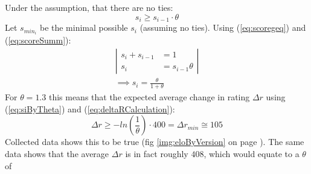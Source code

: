 \documentclass[12pt]{article}
\newcommand{\imgRef}[1]{(fig \ref{#1} on page \pageref{#1})}
\newcommand{\quckeq}[1]{(\ref{#1})}
\newcommand{\quickeq}[1]{\quckeq{#1}}
\newcommand{\FittedEloRaiting}{408}
\begin{document}
Under the assumption, that there are no ties:
\begin{equation}\label{eq:scoregeq}
s_i \geqslant s_{i-1} \cdot \theta
\end{equation}
Let \(s_{min_i}\) be the minimal possible \(s_i\) (assuming no ties). Using \quickeq{eq:scoregeq} and \quickeq{eq:scoreSumm}:
\begin{align}
\left|\begin{aligned}
s_i + s_{i-1} &= 1\\
s_i                 &= s_{i-1}\theta
\end{aligned}\right|\\
\implies s_i = \frac{\theta}{1+\theta}\label{eq:siByTheta}
\end{align}
For \(\theta = 1.3\) this means that the expected average change in rating \(\Delta r\) using \quickeq{eq:siByTheta} and \quickeq{eq:deltaRCalculation}:
\begin{equation}
\Delta r \geqslant -ln\left(\frac{1}{\theta}\right)\cdot 400 = \Delta r_{min} \cong 105
\end{equation}
Collected data shows this to be true \imgRef{img:eloByVersion}. The same data shows that the average \(\Delta r \) is in fact roughly \(\FittedEloRaiting\), which would equate to a \(\theta\) of
\end{document}
